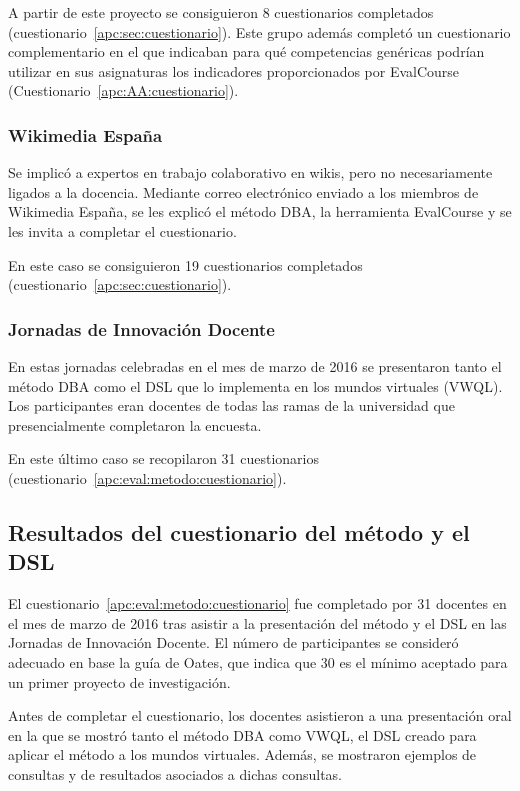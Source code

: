 A partir de este proyecto se consiguieron 8 cuestionarios completados (cuestionario~\ref{apc:sec:cuestionario}). Este grupo además completó un cuestionario complementario en el que indicaban para qué competencias genéricas podrían utilizar en sus asignaturas los indicadores proporcionados por EvalCourse (Cuestionario~\ref{apc:AA:cuestionario}).

	\subsubsection*{Wikimedia España}

	Se implicó a expertos en trabajo colaborativo en wikis, pero no necesariamente ligados a la docencia. Mediante correo electrónico enviado a los miembros de Wikimedia España, se les explicó el método DBA, la herramienta EvalCourse y se les invita a completar el cuestionario.		

En este caso se consiguieron 19 cuestionarios completados (cuestionario~\ref{apc:sec:cuestionario}).

	\subsubsection*{Jornadas de Innovación Docente}

	En estas jornadas celebradas en el mes de marzo de 2016 se presentaron tanto el método DBA como el DSL que lo implementa en los mundos virtuales (VWQL). Los participantes eran docentes de todas las ramas de la universidad que presencialmente completaron la encuesta. 

En este último caso se recopilaron 31 cuestionarios (cuestionario~\ref{apc:eval:metodo:cuestionario}). 


\subsection{Resultados del cuestionario del método y el DSL}

El cuestionario~\ref{apc:eval:metodo:cuestionario} fue completado por 31 docentes en el mes de marzo de 2016 tras asistir a la presentación del método y el DSL en las Jornadas de Innovación Docente. El número de participantes se consideró adecuado en base la guía de Oates, que indica que 30 es el mínimo aceptado para un primer proyecto de investigación.

Antes de completar el cuestionario, los docentes asistieron a una presentación oral en la que se mostró tanto el método DBA como VWQL, el DSL creado para aplicar el método a los mundos virtuales. Además, se mostraron ejemplos de consultas y de resultados asociados a dichas consultas. 

